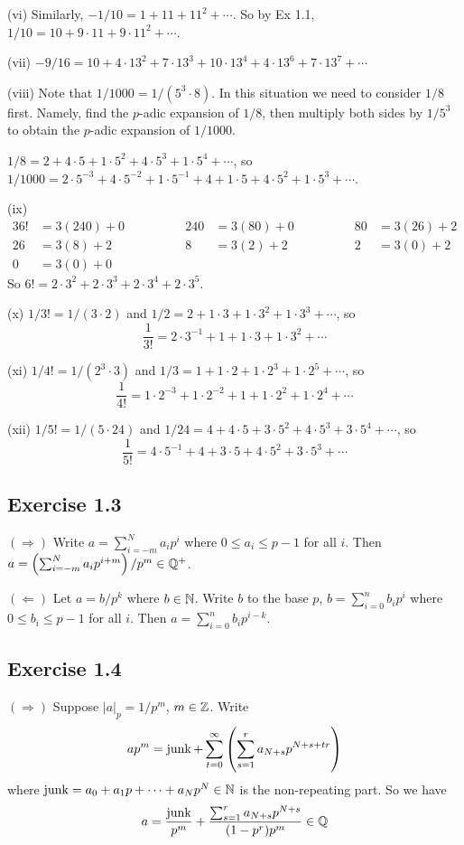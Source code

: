 \documentclass[../Koblitz.tex]{subfiles}
\begin{document}
(vi) Similarly, $-1/10=1+11+11^2+\cdots$. So by Ex 1.1, $1/10=10+9\cdot11+9\cdot11^2+\cdots$.

(vii) $-9/16=10+4\cdot13^2+7\cdot13^3+10\cdot13^4+4\cdot13^6+7\cdot13^7+\cdots$

(viii) Note that $1/1000=1/(5^3\cdot8)$. In this situation we need to consider $1/8$ first. Namely, find the $p$-adic expansion of $1/8$, then multiply both sides by $1/5^3$ to obtain the $p$-adic expansion of $1/1000$.

$1/8=2+4\cdot5+1\cdot5^2+4\cdot5^3+1\cdot5^4+\cdots$, so $1/1000=2\cdot5^{-3}+4\cdot5^{-2}+1\cdot5^{-1}+4+1\cdot5+4\cdot5^2+1\cdot5^3+\cdots$.

(ix) \begin{alignat*}{3}
6!&=3(240)+0 &\qquad\qquad 240&=3(80)+0 &\qquad\qquad 80&=3(26)+2 \\
26&=3(8)+2 &\qquad \qquad 8&=3(2)+2 &\qquad\qquad 2&=3(0)+2 \\
0&=3(0)+0
\end{alignat*}
So $6!=2\cdot3^2+2\cdot3^3+2\cdot3^4+2\cdot3^5$.

(x) $1/3!=1/(3\cdot2)$ and $1/2=2+1\cdot3+1\cdot3^2+1\cdot3^3+\cdots$, so $$\frac{1}{3!}=2\cdot3^{-1}+1+1\cdot3+1\cdot3^2+\cdots$$

(xi) $1/4!=1/(2^3\cdot3)$ and $1/3=1+1\cdot2+1\cdot2^3+1\cdot2^5+\cdots$, so $$\frac{1}{4!}=1\cdot2^{-3}+1\cdot2^{-2}+1+1\cdot2^2+1\cdot2^4+\cdots$$

(xii) $1/5!=1/(5\cdot24)$ and $1/24=4+4\cdot5+3\cdot5^2+4\cdot5^3+3\cdot5^4+\cdots$, so $$\frac{1}{5!}=4\cdot5^{-1}+4+3\cdot5+4\cdot5^2+3\cdot5^3+\cdots$$

\subsection*{Exercise 1.3}

$(\Rightarrow)$ Write $a=\sum_{i=-m}^N a_ip^i$ where $0\leq a_i\leq p-1$ for all $i$. Then $a=\left(\sum_{i=-m}^N a_ip^{i+m}\right)/p^m\in\mathbb{Q}^+$.

$(\Leftarrow)$ Let $a=b/p^k$ where $b\in\mathbb{N}$. Write $b$ to the base $p$, $b=\sum_{i=0}^n b_ip^i$ where $0\leq b_i\leq p-1$ for all $i$. Then $a=\sum_{i=0}^n b_ip^{i-k}$.

\subsection*{Exercise 1.4}

$(\Rightarrow)$ Suppose $|a|_p=1/p^m$, $m\in\mathbb{Z}$. Write $$ap^m=\operatorname{junk}+\sum_{t=0}^\infty \left(\sum_{s=1}^r a_{N+s}p^{N+s+tr}\right)$$ where $\operatorname{junk}=a_0+a_1p+\cdots+a_Np^N\in\mathbb{N}$ is the non-repeating part. So we have $$a = \frac{\operatorname{junk}}{p^m}+\frac{\sum_{s=1}^r a_{N+s}p^{N+s}}{(1-p^r)p^m}\in\mathbb{Q}$$
\end{document}
